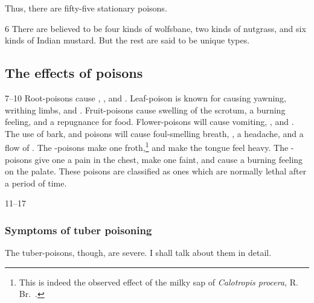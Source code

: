 \begin{translation}
    Thus, there are fifty-five stationary poisons.
    
    \item[6]
    There are believed to be four kinds of wolfsbane, two kinds of nutgrass, and
    six kinds of Indian mustard.  But the rest are said to be unique types.
    
    \subsection{The effects of poisons}
    \item[7--10]
    Root-poisons cause , , and
    .  Leaf-poison is known for causing yawning, writhing
    limbs, and .  Fruit-poisons cause swelling of the
    scrotum, a burning feeling, and a repugnance for food.  Flower-poisons will
    cause vomiting, , and .  The
    use of bark,  and  poisons will cause
    foul-smelling breath, , a headache, and a flow of
    .  The -poisons make one
    froth,\footnote{This is indeed the observed effect of the milky sap of
    \emph{Calotropis procera}, R. Br.\ \citep[no.\,428]{NK}.} and make the tongue
    feel heavy.  The -poisons give one a pain in the chest,
    make one faint, and cause a burning feeling on the palate.  These poisons
    are classified as ones which are normally lethal after a period of time.
    
    \item[11--17]
    
    \subsubsection{Symptoms of tuber poisoning}
    The tuber-poisons, though, are severe.  I shall talk about them in detail.
    

\end{translation}

